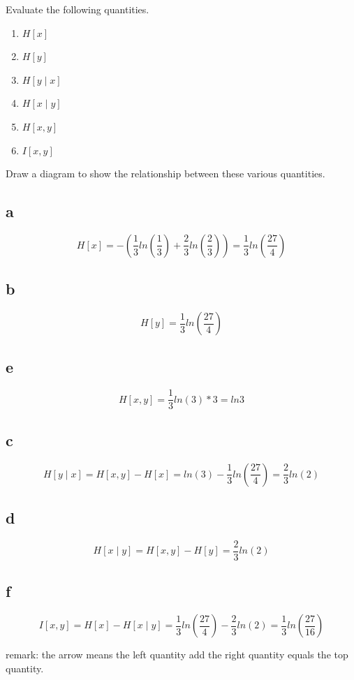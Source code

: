 \documentclass[a4paper, 11pt]{article}
\begin{document}
Evaluate the following quantities.
\begin{enumerate}[label=(\alph*), nosep]
    \item $H[x]$
    \item $H[y]$
    \item $H[y\mid x]$
    \item $H[x\mid y]$
    \item $H[x,y]$
    \item $I[x,y]$
\end{enumerate}

Draw a diagram to show the relationship between these various quantities.
\subsection*{a}
\[
H[x]=-(\frac{1}{3}ln(\frac{1}{3})+\frac{2}{3}ln(\frac{2}{3}))=\frac{1}{3}ln(\frac{27}{4})
\]
\subsection*{b}
\[
H[y]=\frac{1}{3}ln(\frac{27}{4})
\]
\subsection*{e}
\[
H[x,y]=\frac{1}{3}ln(3)*3=ln{3}
\]
\subsection*{c}
\[
H[y\mid x]=H[x,y]-H[x]=ln(3)-\frac{1}{3}ln(\frac{27}{4})=\frac{2}{3}ln(2)
\]
\subsection*{d}
\[
H[x\mid y]=H[x,y]-H[y]=\frac{2}{3}ln(2)
\]

\subsection*{f}
\[
I[x,y]=H[x]-H[x\mid y]=\frac{1}{3}ln(\frac{27}{4})-\frac{2}{3}ln(2)=\frac{1}{3}ln(\frac{27}{16})
\]  
\begin{center}
\end{center}
remark: the arrow means the left quantity add the right quantity equals the top quantity.
\end{document}
